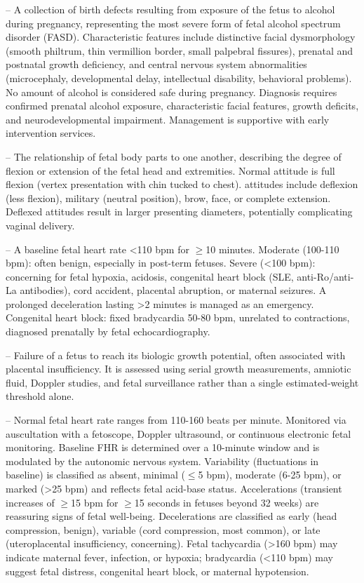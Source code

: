 -- A collection of birth defects resulting from exposure of the fetus to alcohol during pregnancy, representing the most severe form of fetal alcohol spectrum disorder (FASD). Characteristic features include distinctive facial dysmorphology (smooth philtrum, thin vermillion border, small palpebral fissures), prenatal and postnatal growth deficiency, and central nervous system abnormalities (microcephaly, developmental delay, intellectual disability, behavioral problems). No amount of alcohol is considered safe during pregnancy. Diagnosis requires confirmed prenatal alcohol exposure, characteristic facial features, growth deficits, and neurodevelopmental impairment. Management is supportive with early intervention services.

-- The relationship of fetal body parts to one another, describing the degree of flexion or extension of the fetal head and extremities. Normal attitude is full flexion (vertex presentation with chin tucked to chest). attitudes include deflexion (less flexion), military (neutral position), brow, face, or complete extension. Deflexed attitudes result in larger presenting diameters, potentially complicating vaginal delivery.

-- A baseline fetal heart rate <110 bpm for \(\ge\)10 minutes. Moderate (100-110 bpm): often benign, especially in post-term fetuses. Severe (<100 bpm): concerning for fetal hypoxia, acidosis, congenital heart block (SLE, anti-Ro/anti-La antibodies), cord accident, placental abruption, or maternal seizures. A prolonged deceleration lasting >2 minutes is managed as an emergency. Congenital heart block: fixed bradycardia 50-80 bpm, unrelated to contractions, diagnosed prenatally by fetal echocardiography.

-- Failure of a fetus to reach its biologic growth potential, often associated with placental insufficiency. It is assessed using serial growth measurements, amniotic fluid, Doppler studies, and fetal surveillance rather than a single estimated-weight threshold alone.

-- Normal fetal heart rate ranges from 110-160 beats per minute. Monitored via auscultation with a fetoscope, Doppler ultrasound, or continuous electronic fetal monitoring. Baseline FHR is determined over a 10-minute window and is modulated by the autonomic nervous system. Variability (fluctuations in baseline) is classified as absent, minimal (\(\le\)5 bpm), moderate (6-25 bpm), or marked (>25 bpm) and reflects fetal acid-base status. Accelerations (transient increases of \(\ge\)15 bpm for \(\ge\)15 seconds in fetuses beyond 32 weeks) are reassuring signs of fetal well-being. Decelerations are classified as early (head compression, benign), variable (cord compression, most common), or late (uteroplacental insufficiency, concerning). Fetal tachycardia (>160 bpm) may indicate maternal fever, infection, or hypoxia; bradycardia (<110 bpm) may suggest fetal distress, congenital heart block, or maternal hypotension.

